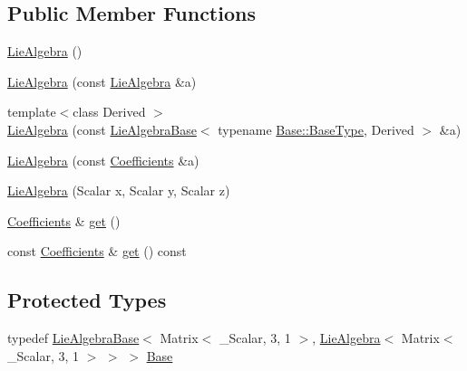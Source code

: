 \subsection*{Public Member Functions}
\begin{DoxyCompactItemize}
\item 
\hyperlink{class_lie_algebra_3_01_matrix_3_01___scalar_00_013_00_011_01_4_01_4_a34165d53d90245bdbba7ccc7166fc37c}{Lie\+Algebra} ()
\item 
\hyperlink{class_lie_algebra_3_01_matrix_3_01___scalar_00_013_00_011_01_4_01_4_afb65734495d34082830aad472ef0d7cf}{Lie\+Algebra} (const \hyperlink{class_lie_algebra}{Lie\+Algebra} \&a)
\item 
{\footnotesize template$<$class Derived $>$ }\\\hyperlink{class_lie_algebra_3_01_matrix_3_01___scalar_00_013_00_011_01_4_01_4_aff1a3dbf146507fa37d80e11acf095e9}{Lie\+Algebra} (const \hyperlink{class_lie_algebra_base}{Lie\+Algebra\+Base}$<$ typename \hyperlink{class_lie_algebra_base_ae7884e2973ffa35f8b209b2831a066a1}{Base\+::\+Base\+Type}, Derived $>$ \&a)
\item 
\hyperlink{class_lie_algebra_3_01_matrix_3_01___scalar_00_013_00_011_01_4_01_4_af105615d1bcc3d5518841493983ee453}{Lie\+Algebra} (const \hyperlink{class_lie_algebra_3_01_matrix_3_01___scalar_00_013_00_011_01_4_01_4_a028504a0d794d492dc47b2edd056fe47}{Coefficients} \&a)
\item 
\hyperlink{class_lie_algebra_3_01_matrix_3_01___scalar_00_013_00_011_01_4_01_4_a3407ec51785ed5f605f4e56f6fd6df1c}{Lie\+Algebra} (Scalar x, Scalar y, Scalar z)
\item 
\hyperlink{class_lie_algebra_3_01_matrix_3_01___scalar_00_013_00_011_01_4_01_4_a028504a0d794d492dc47b2edd056fe47}{Coefficients} \& \hyperlink{class_lie_algebra_3_01_matrix_3_01___scalar_00_013_00_011_01_4_01_4_a66629af289d8232ba9c2650456654091}{get} ()
\item 
const \hyperlink{class_lie_algebra_3_01_matrix_3_01___scalar_00_013_00_011_01_4_01_4_a028504a0d794d492dc47b2edd056fe47}{Coefficients} \& \hyperlink{class_lie_algebra_3_01_matrix_3_01___scalar_00_013_00_011_01_4_01_4_ad1a20c6cdfc1a3f27ac55685b91611e9}{get} () const
\end{DoxyCompactItemize}
\subsection*{Protected Types}
\begin{DoxyCompactItemize}
\item 
typedef \hyperlink{class_lie_algebra_base}{Lie\+Algebra\+Base}$<$ Matrix$<$ \+\_\+\+Scalar, 3, 1 $>$, \hyperlink{class_lie_algebra}{Lie\+Algebra}$<$ Matrix$<$ \+\_\+\+Scalar, 3, 1 $>$ $>$ $>$ \hyperlink{class_lie_algebra_3_01_matrix_3_01___scalar_00_013_00_011_01_4_01_4_a4ebe70151a0dade8c902424f217a3451}{Base}
\end{DoxyCompactItemize}
